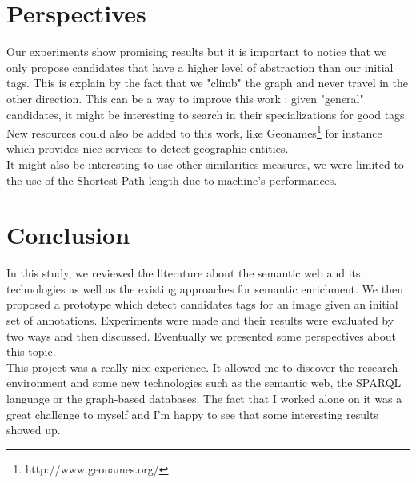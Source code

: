 \section{Perspectives} %
\label{sec:perspectives}
Our experiments show promising results but it is important to notice that we only propose candidates that have a higher level of abstraction than our initial tags. This is explain by the fact that we "climb" the graph and never travel in the other direction. This can be a way to improve this work : given "general" candidates, it might be interesting to search in their specializations for good tags.\\
New resources could also be added to this work, like Geonames\footnote{http://www.geonames.org/} for instance which provides nice services to detect geographic entities. \\
It might also be interesting to use other similarities measures, we were limited to the use of the Shortest Path length due to machine's performances.

\section{Conclusion} %
\label{sec:conclusion}
In this study, we reviewed the literature about the semantic web and its technologies as well as the existing approaches for semantic enrichment. We then proposed a prototype which detect candidates tags for an image given an initial set of annotations. Experiments were made and their results were evaluated by two ways and then discussed. Eventually we presented some perspectives about this topic.\\
This project was a really nice experience. It allowed me to discover the research environment and some new technologies such as the semantic web, the SPARQL language or the graph-based databases. The fact that I worked alone on it was a great challenge to myself and I'm happy to see that some interesting results showed up.\\
